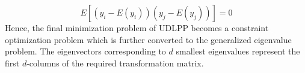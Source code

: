 \begin{equation}\label{ICVGIP-eqn-3}
E\left[ {\left( {{y_i} - E\left( {{y_i}} \right)} \right)\left( {{y_j} - E\left( {{y_j}} \right)} \right)} \right] = 0
\end{equation}
Hence, the final minimization problem of UDLPP becomes a constraint optimization problem which is further converted to the generalized eigenvalue problem. The eigenvectors corresponding to $d$ smallest eigenvalues represent the first $d$-columns of the required transformation matrix.
